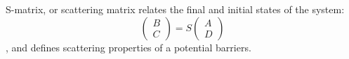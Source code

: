 S-matrix, or scattering matrix relates the final and initial states of the system:
\begin{equation}\label{eq:smatrix}
\begin{pmatrix} B \\ C \end{pmatrix} = S \begin{pmatrix} A \\ D \end{pmatrix}
\end{equation}
, and defines scattering properties of a potential barriers.




